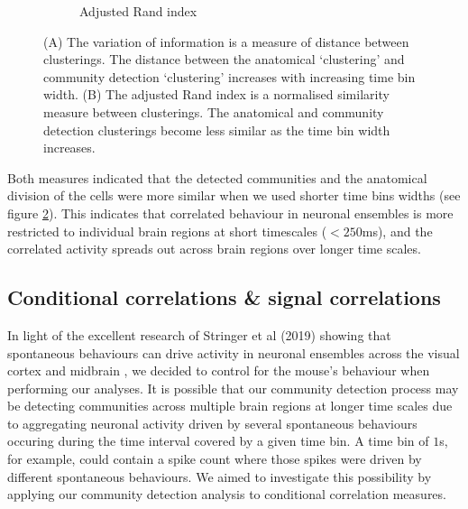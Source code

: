 \begin{figure}[h]
\begin{subfigure}[h]{0.5\linewidth}
      \caption{Adjusted Rand index}
      \label{fig:adjusted_rand_index_rectified_total}
    \end{subfigure}
    \caption{(A) The variation of information is a measure of distance between clusterings. The distance between the anatomical `clustering' and community detection `clustering' increases with increasing time bin width. (B) The adjusted Rand index is a normalised similarity measure between clusterings. The anatomical and community detection clusterings become less similar as the time bin width increases. }
    \label{fig:distance_measures}
  \end{figure}

  Both measures indicated that the detected communities and the anatomical division of the cells were more similar when we used shorter time bins widths (see figure \ref{fig:distance_measures}). This indicates that correlated behaviour in neuronal ensembles is more restricted to individual brain regions at short timescales ($<250$ms), and the correlated activity spreads out across brain regions over longer time scales.

  \subsection{Conditional correlations \& signal correlations}
  In light of the excellent research of Stringer et al (2019) showing that spontaneous behaviours can drive activity in neuronal ensembles across the visual cortex and midbrain \parencite{stringer}, we decided to control for the mouse's behaviour when performing our analyses. It is possible that our community detection process may be detecting communities across multiple brain regions at longer time scales due to aggregating neuronal activity driven by several spontaneous behaviours occuring during the time interval covered by a given time bin. A time bin of $1$s, for example, could contain a spike count where those spikes were driven by different spontaneous behaviours. We aimed to investigate this possibility by applying our community detection analysis to conditional correlation measures.

